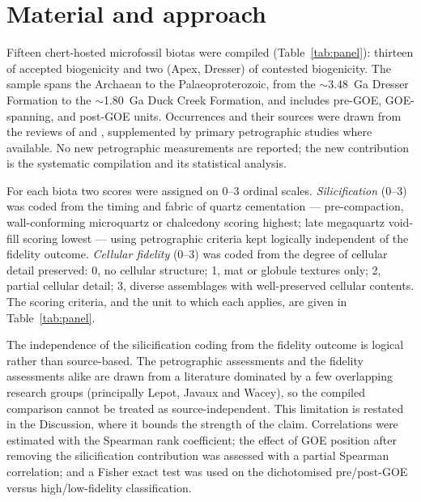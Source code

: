 \documentclass[11pt]{article}
\begin{document}
\section{Material and approach}

Fifteen chert-hosted microfossil biotas were compiled (Table~\ref{tab:panel}): thirteen of accepted
biogenicity and two (Apex, Dresser) of contested biogenicity. The sample spans the Archaean to the
Palaeoproterozoic, from the $\sim$3.48~Ga Dresser Formation to the $\sim$1.80~Ga Duck Creek
Formation, and includes pre-GOE, GOE-spanning, and post-GOE units. Occurrences and their sources
were drawn from the reviews of \citet{Javaux2018} and \citet{Wacey2014}, supplemented by primary
petrographic studies where available. No new petrographic measurements are reported; the new
contribution is the systematic compilation and its statistical analysis.

For each biota two scores were assigned on 0--3 ordinal scales. \emph{Silicification} (0--3) was
coded from the timing and fabric of quartz cementation --- pre-compaction, wall-conforming
microquartz or chalcedony scoring highest; late megaquartz void-fill scoring lowest --- using
petrographic criteria kept logically independent of the fidelity outcome. \emph{Cellular fidelity}
(0--3) was coded from the degree of cellular detail preserved: 0, no cellular structure; 1, mat or
globule textures only; 2, partial cellular detail; 3, diverse assemblages with well-preserved
cellular contents. The scoring criteria, and the unit to which each applies, are given in
Table~\ref{tab:panel}.

The independence of the silicification coding from the fidelity outcome is logical rather than
source-based. The petrographic assessments and the fidelity assessments alike are drawn from a
literature dominated by a few overlapping research groups (principally Lepot, Javaux and Wacey), so
the compiled comparison cannot be treated as source-independent. This limitation is restated in the
Discussion, where it bounds the strength of the claim. Correlations were estimated with the Spearman
rank coefficient; the effect of GOE position after removing the silicification contribution was
assessed with a partial Spearman correlation; and a Fisher exact test was used on the dichotomised
pre/post-GOE versus high/low-fidelity classification.
\end{document}
